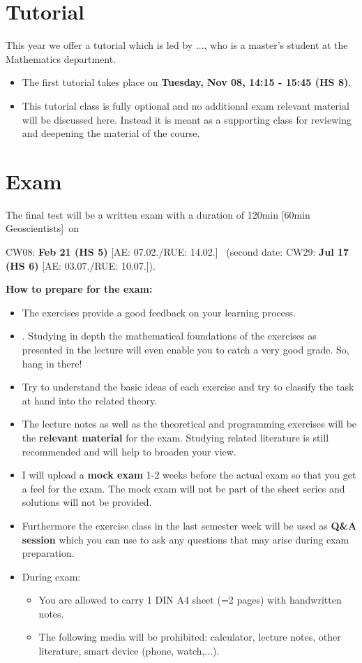\documentclass{article}
\def\corrector{...}
\def\firsttut{{\color{black} \bfseries Tuesday, Nov 08, 14:15 - 15:45 (HS 8)}}
\def\examdateOne{{\color{red}CW08: \textbf{Feb 21 (HS 5)}} [AE: 07.02./RUE: 14.02.]}
\def\examduration{120min [60min Geoscientists]}
\def\examdateTwo{{\color{red}CW29: \textbf{Jul 17 (HS 6)}} [AE: 03.07./RUE: 10.07.]}
\begin{document}
\section{Tutorial}
This year we offer a tutorial which is led by \corrector, who is a master’s student at the Mathematics department. 
\begin{itemize}
	\item The first tutorial takes place on \firsttut.
	\item This tutorial class is fully optional and no additional exam relevant material will be discussed here. Instead it is meant as a supporting class for reviewing and deepening the material of the course.
\end{itemize}
\section{Exam}
The final test will be a written exam with a duration of \examduration~on
\begin{center}
	{\examdateOne} ~(second date: \examdateTwo).
\end{center}
%
\textbf{How to prepare for the exam:}
\begin{itemize}
	\item The exercises provide a good feedback on your learning process.
	\item \textbf{}. Studying in depth the mathematical foundations of the exercises as presented in the lecture will even enable you to catch a very good grade. So, hang in there!
	\item Try to understand the basic ideas of each exercise and try to classify the task at hand into the related theory.
	\item The lecture notes as well as the theoretical and programming exercises will be the \textbf{relevant material} for the exam.  Studying related literature is still recommended and will help to broaden your view.
	\item I will upload a \textbf{mock exam} 1-2 weeks before the actual exam so that you get a feel for the exam. The mock exam will not be part of the sheet series and solutions will not be provided.
	\item Furthermore the exercise class in the last semester week will be used as \textbf{Q\&A session} which you can use to ask any questions that may arise during exam preparation.
	\item During exam:
	\begin{itemize}
		\item You are allowed to carry 1 DIN A4 sheet (=2 pages) with handwritten notes.
		\item The  following  media  will be  prohibited:  calculator,  lecture  notes,  other literature, smart device (phone, watch,...).
	\end{itemize}
\end{itemize}
\end{document}
